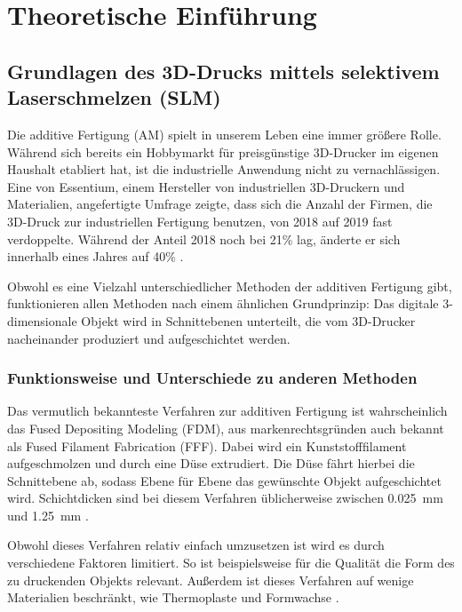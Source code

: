 \chapter{Theoretische Einführung}



\section{Grundlagen des 3D-Drucks mittels selektivem Laserschmelzen (SLM)}
    Die additive Fertigung (AM) spielt in unserem Leben eine immer größere Rolle. Während sich bereits
    ein Hobbymarkt für preisgünstige 3D-Drucker im eigenen Haushalt etabliert hat, ist die
    industrielle Anwendung nicht zu vernachlässigen. Eine von Essentium, einem Hersteller von
    industriellen 3D-Druckern und Materialien, angefertigte Umfrage zeigte, dass sich die Anzahl der
    Firmen, die 3D-Druck zur industriellen Fertigung benutzen, von 2018 auf 2019 fast verdoppelte.
    Während der Anteil 2018 noch bei 21\% lag, änderte er sich innerhalb eines Jahres auf 40\%
    \cite{stevenson2019survey}.
    
    Obwohl es eine Vielzahl unterschiedlicher Methoden der additiven Fertigung gibt, funktionieren
    allen Methoden nach einem ähnlichen Grundprinzip: Das digitale 3-dimension\-ale Objekt wird in
    Schnittebenen unterteilt, die vom 3D-Drucker nacheinander produziert und aufgeschichtet werden.

    \subsection{Funktionsweise und Unterschiede zu anderen Methoden}
        Das vermutlich bekannteste Verfahren zur additiven Fertigung ist wahrscheinlich das
        Fused Depositing Modeling (FDM), aus markenrechtsgründen auch bekannt als
        Fused Filament Fabrication (FFF). Dabei wird ein Kunststofffilament aufgeschmolzen und durch
        eine Düse extrudiert. Die Düse fährt hierbei die Schnittebene ab, sodass Ebene für Ebene das
        gewünschte Objekt aufgeschichtet wird. Schichtdicken sind bei diesem Verfahren üblicherweise
        zwischen \SI{0,025}{\milli\meter} und \SI{1,25}{\milli\meter} \cite{wikipedia2021fused}.

        Obwohl dieses Verfahren relativ einfach umzusetzen ist wird es durch verschiedene Faktoren
        limitiert. So ist beispielsweise für die Qualität die Form des zu druckenden Objekts relevant.
        Außerdem ist dieses Verfahren auf wenige Materialien beschränkt, wie Thermoplaste und Formwachse
        \cite{wikipedia2021fused}.

